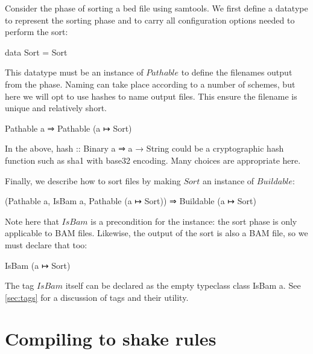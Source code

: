 \documentclass{article}
\begin{document}
\begin{example}
  \label{ex:sort}
  Consider the phase of sorting a bed file using samtools. We first define a
  datatype to represent the sorting phase and to carry all configuration options
  needed to perform the sort:
  \begin{haskell*}
    data Sort = Sort
  \end{haskell*}
  
  This datatype must be an instance of $Pathable$ to define the filenames output
  from the phase. Naming can take place according to a number of schemes, but
  here we will opt to use hashes to name output files. This ensure the filename
  is unique and relatively short.
  \begin{haskell*}
     Pathable a ⇒ Pathable (a ↦ Sort) 
  \end{haskell*}
  In the above, \<hash :: Binary a ⇒ a → String\> could be a cryptographic hash
  function such as sha1 with base32 encoding. Many choices are appropriate here.

  Finally, we describe how to sort files by making $Sort$ an instance of
  $Buildable$:
  \begin{haskell*}
     (Pathable a, IsBam a, Pathable (a ↦ Sort)) ⇒ Buildable (a ↦ Sort)  
  \end{haskell*}
  Note here that $IsBam$ is a precondition for the instance: the sort phase is
  only applicable to BAM files. Likewise, the output of the sort is also a BAM
  file, so we must declare that too:
  \begin{haskell*}
     IsBam (a ↦ Sort)
  \end{haskell*}
  The tag $IsBam$ itself can be declared as the empty typeclass \<class IsBam
  a\>. See \cref{sec:tags} for a discussion of tags and their utility.
\end{example}

\section{Compiling to shake rules}
\end{document}

